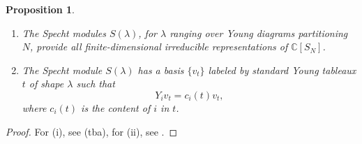\documentclass[11pt]{report}
\newtheorem{prop}[theorem]{Proposition}
\theoremstyle{definition}
\theoremstyle{remark}
\theoremstyle{remark}
\newcommand{\C}{\mathbb{C}}
\begin{document}
\begin{prop}
\begin{enumerate}[label=(\roman*)]
\item The Specht modules $S(\lambda)$, for $\lambda$ ranging over Young diagrams partitioning $N$, provide all finite-dimensional irreducible representations of $\C[S_N]$.
\item The Specht module $S(\lambda)$ has a basis $\{ v_t \}$ labeled by standard Young tableaux $t$ of shape $\lambda$ such that
\begin{equation*}
Y_i v_t = c_i(t) v_t,
\end{equation*}
where $c_i(t)$ is the content of $i$ in $t$.
\end{enumerate}
\end{prop}

\begin{proof}
For (i), see (tba), for (ii), see \cite{article:murphy:1981}.
\end{proof}
\end{document}
